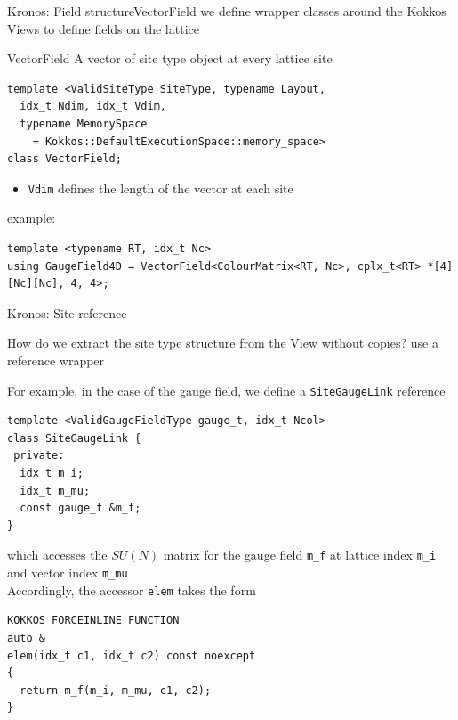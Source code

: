 \begin{frame}[fragile]{Kronos: Field structure}{VectorField}
  we define wrapper classes around the Kokkos Views to
  define fields on the lattice\\

  \begin{block}{VectorField}
    A vector of site type object at
    every lattice site
  \end{block}

  \begin{verbatim}
template <ValidSiteType SiteType, typename Layout,
  idx_t Ndim, idx_t Vdim,
  typename MemorySpace 
    = Kokkos::DefaultExecutionSpace::memory_space>
class VectorField;
  \end{verbatim}

  \begin{itemize}
    \item \verb|Vdim| defines the length of the vector at each site
  \end{itemize}

  example:

  \begin{verbatim}
template <typename RT, idx_t Nc>
using GaugeField4D = VectorField<ColourMatrix<RT, Nc>, cplx_t<RT> *[4][Nc][Nc], 4, 4>;
  \end{verbatim}

\end{frame}

\begin{frame}[fragile]{Kronos: Site reference}
  
  \begin{bkalertblock}{How do we extract the site type structure from the View without copies?}
    use a reference wrapper
  \end{bkalertblock}

  For example, in the case of the gauge field, we define a
  \verb|SiteGaugeLink| reference

  \begin{verbatim}
template <ValidGaugeFieldType gauge_t, idx_t Ncol>
class SiteGaugeLink {
 private:
  idx_t m_i;
  idx_t m_mu;
  const gauge_t &m_f;
}
  \end{verbatim}

  which accesses the $SU(N)$ matrix for the gauge field \verb|m_f| at lattice index
  \verb|m_i| and vector index \verb|m_mu|\\

  Accordingly, the accessor \verb|elem| takes the form

  \begin{verbatim}
KOKKOS_FORCEINLINE_FUNCTION
auto &
elem(idx_t c1, idx_t c2) const noexcept
{
  return m_f(m_i, m_mu, c1, c2);
}
  \end{verbatim}

\end{frame}

